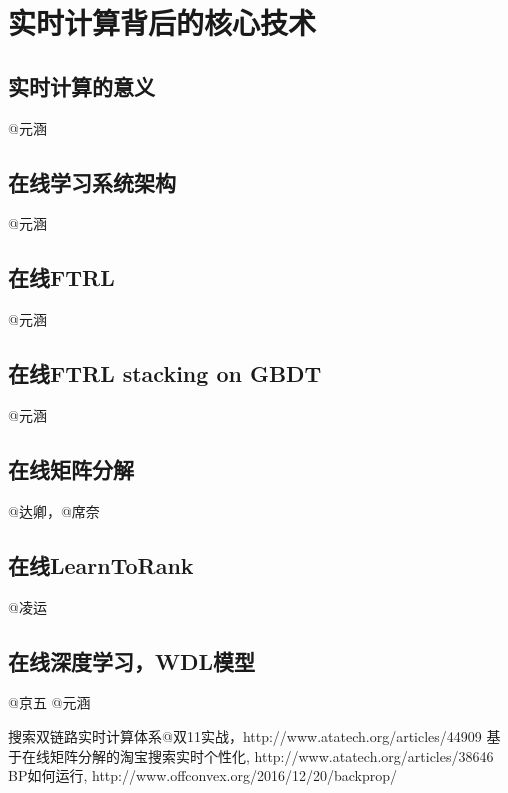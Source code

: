 
\chapter{实时计算背后的核心技术}
\thispagestyle{empty}

\setlength{\fboxrule}{0pt}\setlength{\fboxsep}{0cm}
\noindent\shadowbox{
\begin{tcolorbox}[arc=0mm,colback=lightblue,colframe=darkblue,title=学习目标与要求]

\end{tcolorbox}}
\setlength{\fboxrule}{1pt}\setlength{\fboxsep}{4pt} 

\section{实时计算的意义}
	@元涵

\section{在线学习系统架构}
	@元涵
	
\section{在线FTRL}
	@元涵
	
\section{在线FTRL stacking on GBDT}
	@元涵

\section{在线矩阵分解}
	@达卿，@席奈

\section{在线LearnToRank} 
	@凌运 

\section{在线深度学习，WDL模型} 
	@京五 @元涵

\begin{thebibliography}{99}
 搜索双链路实时计算体系@双11实战，http://www.atatech.org/articles/44909
 基于在线矩阵分解的淘宝搜索实时个性化, http://www.atatech.org/articles/38646
 BP如何运行, http://www.offconvex.org/2016/12/20/backprop/
\end{thebibliography}

 
